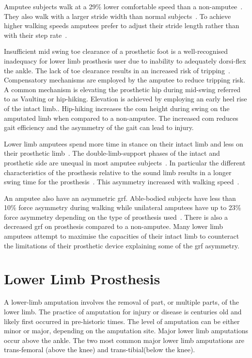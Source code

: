 Amputee subjects walk at a 29\% lower comfortable speed than a non-amputee~\cite{ Jaegers1995, Boonstra1993}. They also walk with a larger stride width than normal subjects~\cite{Jaegers1995}. To achieve higher walking speeds amputees prefer to adjust their stride length rather than with their step rate~\cite{Jaegers1995, Rabuffetti2005}.

Insufficient mid swing toe clearance of a prosthetic foot is a well-recognised inadequacy for lower limb prosthesis user due to inability to adequately dorsi-flex the ankle. The lack of toe clearance results in an increased risk of tripping~\cite{Lechler2018}. Compensatory mechanisms are employed by the amputee to reduce tripping risk. A common mechanism is elevating the prosthetic hip during mid-swing referred to as Vaulting or hip-hiking. Elevation is achieved by employing an early heel rise of the intact limb.\cite{Drevelle2014, Lechler2018}. Hip-hiking increases the \acrshort{com} height during swing on the amputated limb when compared to a non-amputee. The increased \acrshort{com} reduces gait efficiency and the asymmetry of the gait can lead to injury.


Lower limb amputees spend more time in stance on their intact limb and less on their prosthetic limb~\cite{Nolan2003}. The double-limb-support phases of the intact and prosthetic side are unequal in most amputee subjects~\cite{Jaegers1995}. In particular the different characteristics of the prosthesis relative to the sound limb results in a longer swing time for the prosthesis~\cite{Burkett2004}. This asymmetry increased with walking speed~\cite{Nolan2003}.

An amputee also have an asymmetric \acrfull{grf}. Able-bodied subjects have less than 10\% force asymmetry during walking while unilateral amputees have up to 23\% force asymmetry depending on the type of prosthesis used~\cite{Nolan2003}. There is also a decreased \acrshort{grf} on prosthesis compared to a non-amputee\cite{Kovac2009}. Many lower limb amputees attempt to maximise the capacities of their intact limb to counteract the limitations of their prosthetic device explaining some of the \acrshort{grf} asymmetry\cite{Ochoa-Diaz2020}. 




\section{Lower Limb Prosthesis}
\label{sec:background-Prosthesis}
A lower-limb amputation involves the removal of part, or multiple parts, of the lower limb. The practice of amputation for injury or disease is centuries old and likely first occurred in pre-historic times\cite{Kirkup2007}. The level of amputation can be either minor or major, depending on the amputation site. Major lower limb amputations occur above the ankle. The two most common major lower limb amputations are trans-femoral (above the knee) and trans-tibial(below the knee).

